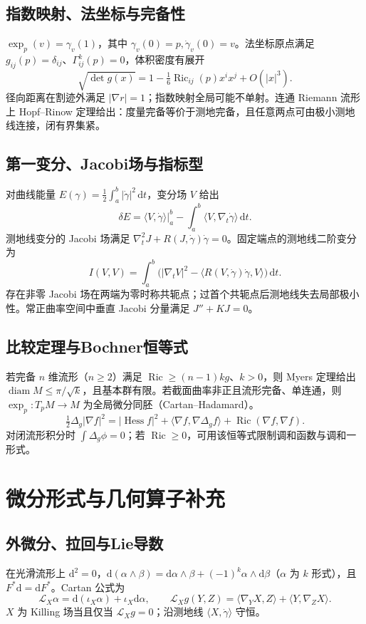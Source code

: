 \documentclass[../main.tex]{subfiles}
\begin{document}
\subsection{指数映射、法坐标与完备性}
$\exp_p(v)=\gamma_v(1)$，其中 $\gamma_v(0)=p,\dot\gamma_v(0)=v$。法坐标原点满足 $g_{ij}(p)=\delta_{ij}$、$\Gamma^k_{ij}(p)=0$，体积密度有展开
\[
\sqrt{\det g(x)}=1-\tfrac16\operatorname{Ric}_{ij}(p)x^ix^j+O(|x|^3).
\]
径向距离在割迹外满足 $|\nabla r|=1$；指数映射全局可能不单射。连通 Riemann 流形上 Hopf--Rinow 定理给出：度量完备等价于测地完备，且任意两点可由极小测地线连接，闭有界集紧。
\subsection{第一变分、Jacobi场与指标型}
对曲线能量 $E(\gamma)=\tfrac12\int_a^b|\dot\gamma|^2\,\mathrm dt$，变分场 $V$ 给出
\[
\delta E=\langle V,\dot\gamma\rangle\big|_a^b-\int_a^b\langle V,\nabla_t\dot\gamma\rangle\,\mathrm dt.
\]
测地线变分的 Jacobi 场满足 $\nabla_t^2J+R(J,\dot\gamma)\dot\gamma=0$。固定端点的测地线二阶变分为
\[
I(V,V)=\int_a^b\bigl(|\nabla_tV|^2-\langle R(V,\dot\gamma)\dot\gamma,V\rangle\bigr)\,\mathrm dt.
\]
存在非零 Jacobi 场在两端为零时称共轭点；过首个共轭点后测地线失去局部极小性。常正曲率空间中垂直 Jacobi 分量满足 $J''+KJ=0$。
\subsection{比较定理与Bochner恒等式}
若完备 $n$ 维流形（$n\ge2$）满足 $\operatorname{Ric}\ge(n-1)kg$、$k>0$，则 Myers 定理给出 $\operatorname{diam}M\le\pi/\sqrt k$，且基本群有限。若截面曲率非正且流形完备、单连通，则 $\exp_p:T_pM\to M$ 为全局微分同胚（Cartan--Hadamard）。
\[
\tfrac12\Delta_g|\nabla f|^2=|\operatorname{Hess}f|^2+
\langle\nabla f,\nabla\Delta_gf\rangle+\operatorname{Ric}(\nabla f,\nabla f).
\]
对闭流形积分时 $\int\Delta_g\phi=0$；若 $\operatorname{Ric}\ge0$，可用该恒等式限制调和函数与调和一形式。
\section{微分形式与几何算子补充}
\subsection{外微分、拉回与Lie导数}
在光滑流形上 $\mathrm d^2=0$，$\mathrm d(\alpha\wedge\beta)=\mathrm d\alpha\wedge\beta+(-1)^k\alpha\wedge\mathrm d\beta$（$\alpha$ 为 $k$ 形式），且 $F^*\mathrm d=\mathrm dF^*$。Cartan 公式为
\[
\mathcal L_X\alpha=\mathrm d(\iota_X\alpha)+\iota_X\mathrm d\alpha,\qquad
\mathcal L_Xg(Y,Z)=\langle\nabla_YX,Z\rangle+\langle Y,\nabla_ZX\rangle.
\]
$X$ 为 Killing 场当且仅当 $\mathcal L_Xg=0$；沿测地线 $\langle X,\dot\gamma\rangle$ 守恒。
\end{document}
